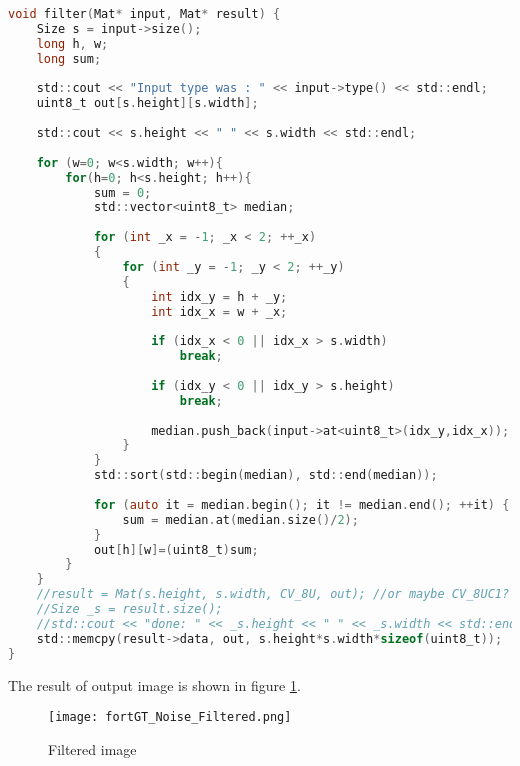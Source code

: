 \begin{lstlisting}[language=C, caption=Noise correction filter, label=lst:noise_filter]
void filter(Mat* input, Mat* result) {
    Size s = input->size();
    long h, w;
    long sum;
    
    std::cout << "Input type was : " << input->type() << std::endl;
    uint8_t out[s.height][s.width];
    
    std::cout << s.height << " " << s.width << std::endl;
    
    for (w=0; w<s.width; w++){
        for(h=0; h<s.height; h++){
            sum = 0;
            std::vector<uint8_t> median;
            
            for (int _x = -1; _x < 2; ++_x)
            {
                for (int _y = -1; _y < 2; ++_y)
                {
                    int idx_y = h + _y;
                    int idx_x = w + _x;
                    
                    if (idx_x < 0 || idx_x > s.width)
                        break;
                        
                    if (idx_y < 0 || idx_y > s.height)
                        break;
                    
                    median.push_back(input->at<uint8_t>(idx_y,idx_x));
                }
            }
            std::sort(std::begin(median), std::end(median));
                    
            for (auto it = median.begin(); it != median.end(); ++it) {
                sum = median.at(median.size()/2);
            }
            out[h][w]=(uint8_t)sum;
        }
    }
    //result = Mat(s.height, s.width, CV_8U, out); //or maybe CV_8UC1?
    //Size _s = result.size();
    //std::cout << "done: " << _s.height << " " << _s.width << std::endl;
    std::memcpy(result->data, out, s.height*s.width*sizeof(uint8_t));
}
\end{lstlisting}


The result of output image is shown in figure \ref{fig:fortGT_Noise_Filtered}.

\begin{figure}[h!]
    \centering
    \texttt{[image: fortGT\_Noise\_Filtered.png]}
    \caption{Filtered image}
    \label{fig:fortGT_Noise_Filtered}
\end{figure}